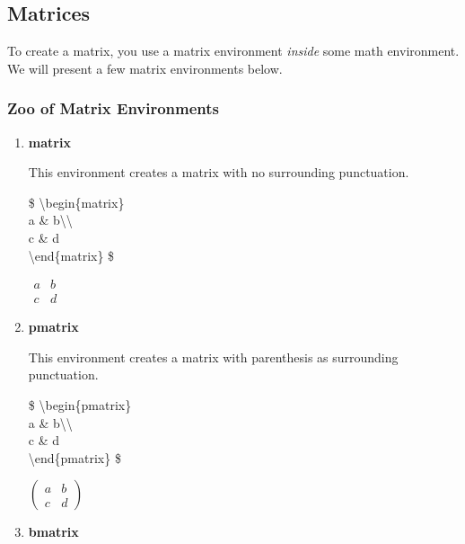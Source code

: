 \documentclass[11pt,onecolumn]{article}
\theoremstyle{definition}
\begin{document}
\subsection{Matrices}

To create a matrix, you use a matrix environment \textit{inside} some math environment. We will present a few matrix environments below.

\subsubsection{Zoo of Matrix Environments}

\begin{enumerate}
    \item \textbf{matrix}
    
    This environment creates a matrix with no surrounding punctuation.
    
    \begin{tcolorbox}
    \$
    \textbackslash begin\{matrix\}\\
        a \& b\textbackslash\textbackslash\\
        c \& d\\
    \textbackslash end\{matrix\}
    \$
    \end{tcolorbox}
    
    $
    \begin{matrix}
        a & b\\
        c & d
    \end{matrix}
    $
    
    \item \textbf{pmatrix}
    
    This environment creates a matrix with parenthesis as surrounding punctuation.
    
    \begin{tcolorbox}
    \$
    \textbackslash begin\{pmatrix\}\\
        a \& b\textbackslash\textbackslash\\
        c \& d\\
    \textbackslash end\{pmatrix\}
    \$
    \end{tcolorbox}
    
    $\begin{pmatrix}
        a & b\\
        c & d
    \end{pmatrix}$
    
    \item \textbf{bmatrix}
    

\end{enumerate}
\end{document}
